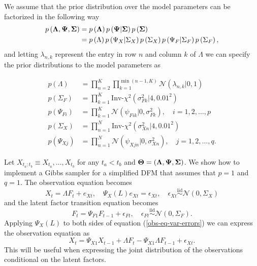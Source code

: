 We assume that the prior distribution over the model parameters can be factorized in the following way
\begin{equation}
	\begin{aligned}
		p \left( \bf \Lambda, \Psi, \Sigma \right) &= p \left( \bf \Lambda \right) p \left( \bf \Psi | \Sigma \right) p \left( \bf \Sigma \right) \\
		&= p \left( \Lambda \right) p \left( \Psi_X | \Sigma_X \right) p \left( \Sigma_X \right) p \left( \Psi_F | \Sigma_F \right) p \left( \Sigma_F \right),
	\end{aligned}
\end{equation}
and letting $\lambda_{n,k}$ represent the entry in row $n$ and column $k$ of $\Lambda$ we can specify the prior distributions to the model parameters as

\begin{align}
	p \left(\Lambda \right)	&= \prod_{n = 2}^K \prod_{k = 1}^{\min (n - 1, K)} \mathcal N \left( \lambda_{n,k} | 0, 1 \right) \\
	p \left( \Sigma_F \right) &= \prod_{k=1}^K \text{Inv-}\chi^2 \left( \sigma^2_{Fk} | 4, 0.01^2 \right) \\
	p \left( \Psi_{Fi} \right) &= \prod_{k=1}^K \mathcal N \left( \psi_{Fi k} | 0, \sigma^2_{Fk} \right), \quad i = 1, 2, \ldots, p \\
	p \left( \Sigma_X \right) &= \prod_{n=1}^N \text{Inv-}\chi^2 \left( \sigma^2_{Xn} | 4, 0.01^2 \right) \\
	p \left( \Psi_{Xj} \right) &= \prod_{n=1}^N \mathcal N \left( \psi_{Xj n} | 0, \sigma^2_{Xn} \right), \quad j = 1, 2, \ldots, q.
\end{align}

Let $X_{t_a:t_b} \equiv X_{t_a}, \ldots, X_{t_b}$ for any $t_a < t_b$ and ${ \bf \Theta } = \left( \bf \Lambda, \Psi, \Sigma \right)$. We show how to implement a Gibbs sampler for a simplified DFM that assumes that $p = 1$ and $q = 1$. The observation equation becomes
\begin{equation}
	X_t = \Lambda F_t + e_{Xt} , \quad \Psi_X (L) e_{Xt} = \epsilon_{Xt}, \quad \epsilon_{Xt} \overset{\text{iid}}{\sim} \mathcal N \left( 0, \Sigma_X \right) \label{obs-eq-var-errors}
\end{equation}
and the latent factor transition equation becomes
\begin{equation}
	F_t = \Psi_{F1} F_{t-1} + \epsilon_{Ft}, \quad \epsilon_{Ft} \overset{\text{iid}}{\sim} \mathcal N \left( 0, \Sigma_F \right).	
\end{equation}
Applying $\Psi_X (L)$ to both sides of equation (\ref{obs-eq-var-errors}) we can express the observation equation as
\begin{equation}
	X_t = \Psi_{X1} X_{t-1} + \Lambda F_t - \Psi_{X1} \Lambda F_{t-1} + \epsilon_{Xt}.
\end{equation}
This will be useful when expressing the joint distribution of the observations conditional on the latent factors. 

